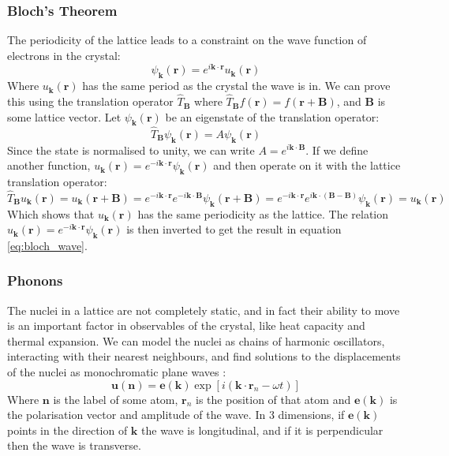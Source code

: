 \documentclass[12pt]{article}
\begin{document}
\subsubsection{Bloch's Theorem}
The periodicity of the lattice leads to a constraint on the wave function of electrons in the crystal:
\begin{equation}\label{eq:bloch_wave}
	\psi_\mathbf k(\mathbf r) = e^{i\mathbf{k}\cdot \mathbf{r}}u_\mathbf k(\mathbf r)
\end{equation}
Where $u_\mathbf k(\mathbf r)$ has the same period as the crystal the wave is in.
We can prove this using the translation operator $\hat T_\mathbf B$ where $\hat T_\mathbf B f(\mathbf r) = f(\mathbf r + \mathbf B)$, and $\mathbf B$ is some lattice vector. Let $\psi_\mathbf k(\mathbf r)$ be an eigenstate of the translation operator:
\begin{equation}
	\hat T_\mathbf B \psi_\mathbf k(\mathbf r) = A \psi_\mathbf k(\mathbf r)
\end{equation}
Since the state is normalised to unity, we can write $A=e^{i\mathbf k \cdot \mathbf B}$. If we define another function, $u_\mathbf k(\mathbf r) = e^{-i\mathbf k \cdot \mathbf r}\psi_\mathbf k(\mathbf r)$ and then operate on it with the lattice translation operator:
\begin{equation}\label{eq:bloch_proof}
\hat T_\mathbf B u_\mathbf k(\mathbf r) = u_\mathbf k(\mathbf r + \mathbf B) = 
e^{-i\mathbf k \cdot \mathbf r}e^{-i\mathbf k \cdot \mathbf B} \psi_\mathbf k(\mathbf r + \mathbf B) = 
e^{-i\mathbf k \cdot \mathbf r}e^{i\mathbf k \cdot (\mathbf B - \mathbf B)} \psi_\mathbf k(\mathbf r) = u_\mathbf k(\mathbf r)
\end{equation}
Which shows that $u_\mathbf k(\mathbf r)$ has the same periodicity as the lattice. The relation $u_\mathbf k(\mathbf r) = e^{-i \mathbf k \cdot \mathbf r}\psi_\mathbf k(\mathbf r)$ is then inverted to get the result in equation \ref{eq:bloch_wave}.
\subsubsection{Phonons}

The nuclei in a lattice are not completely static, and in fact their ability to move is an important factor in observables of the crystal, like heat capacity and thermal expansion. We can model the nuclei as chains of harmonic oscillators, interacting with their nearest neighbours, and find solutions to the displacements of the nuclei as monochromatic plane waves \cite{landau1980statistical}:
\begin{equation}
	\mathbf u(\mathbf n) = \mathbf e(\mathbf k) \exp{[i(\mathbf k \cdot \mathbf r_n - \omega t)]}
\end{equation}
Where $\mathbf n$ is the label of some atom, $\mathbf r_n$ is the position of that atom and $\mathbf e(\mathbf k)$ is the polarisation vector and amplitude of the wave. In 3 dimensions, if $\mathbf e(\mathbf k)$ points in the direction of $\mathbf k$ the wave is longitudinal, and if it is perpendicular then the wave is transverse.
\end{document}
